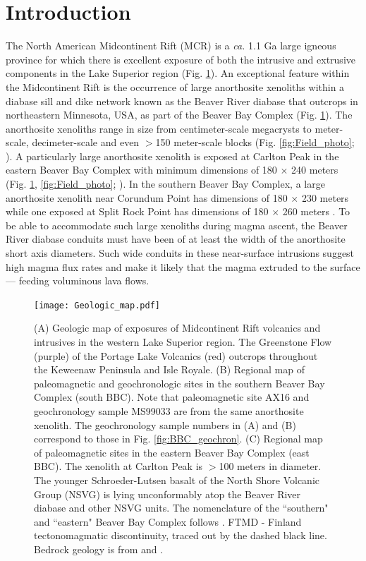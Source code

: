 \documentclass[draft]{agujournal2019}
\begin{document}
\section{Introduction}

The North American Midcontinent Rift (MCR) is a \textit{ca.} 1.1 Ga large igneous province for which there is excellent exposure of both the intrusive and extrusive components in the Lake Superior region (Fig. \ref{fig:Geologic_map}). An exceptional feature within the Midcontinent Rift is the occurrence of large anorthosite xenoliths within a diabase sill and dike network known as the Beaver River diabase that outcrops in northeastern Minnesota, USA, as part of the Beaver Bay Complex (Fig. \ref{fig:Geologic_map}). The anorthosite xenoliths range in size from centimeter-scale megacrysts to meter-scale, decimeter-scale and even $>$150 meter-scale blocks (Fig. \ref{fig:Field_photo}; ). A particularly large anorthosite xenolith is exposed at Carlton Peak in the eastern Beaver Bay Complex with minimum dimensions of 180 $\times$ 240 meters (Fig. \ref{fig:Geologic_map}, \ref{fig:Field_photo}; ). In the southern Beaver Bay Complex, a large anorthosite xenolith near Corundum Point has dimensions of 180 $\times$ 230 meters while one exposed at Split Rock Point has dimensions of 180 $\times$ 260 meters \cite{Boerboom2004a}. To be able to accommodate such large xenoliths during magma ascent, the Beaver River diabase conduits must have been of at least the width of the anorthosite short axis diameters. Such wide conduits in these near-surface intrusions suggest high magma flux rates and make it likely that the magma extruded to the surface --- feeding voluminous lava flows.  

\begin{figure}[h!]
\noindent\texttt{[image: Geologic\_map.pdf]}
\centering
\caption{\footnotesize{(A) Geologic map of exposures of Midcontinent Rift volcanics and intrusives in the western Lake Superior region. The Greenstone Flow (purple) of the Portage Lake Volcanics (red) outcrops throughout the Keweenaw Peninsula and Isle Royale. (B) Regional map of paleomagnetic and geochronologic sites in the southern Beaver Bay Complex (south BBC). Note that paleomagnetic site AX16 and geochronology sample MS99033 are from the same anorthosite xenolith. The geochronology sample numbers in (A) and (B) correspond to those in Fig. \ref{fig:BBC_geochron}. (C) Regional map of paleomagnetic sites in the eastern Beaver Bay Complex (east BBC). The xenolith at Carlton Peak is $>$100 meters in diameter. The younger Schroeder-Lutsen basalt of the North Shore Volcanic Group (NSVG) is lying unconformably atop the Beaver River diabase and other NSVG units. The nomenclature of the ``southern" and ``eastern" Beaver Bay Complex follows . FTMD - Finland tectonomagmatic discontinuity, traced out by the dashed black line. Bedrock geology is from  and .}}
\label{fig:Geologic_map}
\end{figure}
\end{document}
